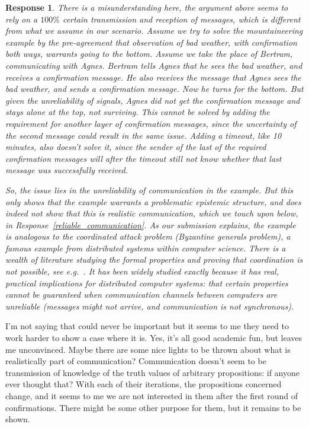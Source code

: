 \documentclass[a4paper]{article}
\newtheorem{response}{Response}
\newenvironment{tobo}{\smallskip \noindent \color{yellow!80!black!80}}{\color{black}\smallskip}
\begin{document}
\begin{response}
There is a misunderstanding here, the argument above seems to rely on a $100\% $ certain transmission and reception of messages, which is different from what we assume in our scenario. Assume we try to solve the mountaineering example by the pre-agreement that observation of bad weather, with confirmation both ways, warrants going to the bottom. Assume we take the place of Bertram, communicating with Agnes. Bertram tells Agnes that he sees the bad weather, and receives a confirmation message. He also receives the message that Agnes sees the bad weather, and sends a confirmation message. Now he turns for the bottom. But given the unreliability of signals, Agnes did not get the confirmation message and stays alone at the top, not surviving. This cannot be solved by adding the requirement for another layer of confirmation messages, since the uncertainty of the second message could result in the same issue. Adding a timeout, like 10 minutes, also doesn't solve it, since the sender of the last of the required confirmation messages will after the timeout still not know whether that last message was successfully received. 

So, the issue lies in the unreliability of communication in the example. But this only shows that the example warrants a problematic epistemic structure, and does indeed not show that this is realistic communication, which we touch upon below, in Response~\ref{reliable_communication}. As our submission explains, the example is analogous to the coordinated attack problem (Byzantine generals problem), a famous example from distributed systems within computer science. There is a wealth of literature studying the formal properties and proving that coordination is not possible, see e.g.~\cite{fagin1995reasoning}. It has been widely studied exactly because it has real, practical implications for distributed computer systems: that certain properties cannot be guaranteed when communication channels between computers are unreliable (messages might not arrive, and communication is not synchronous).
\end{response}

I'm not saying that could never be important but it seems to me they need to work harder to show a case where it is. Yes, it's all good academic fun, but leaves me unconvinced. Maybe there are some nice lights to be thrown about what is realistically part of communication? Communication doesn't seem to be transmission of knowledge of the truth values of arbitrary propositions: if anyone ever thought that? With each of their iterations, the propositions concerned change, and it seems to me we are not interested in them after the first round of confirmations. There might be some other purpose for them, but it remains to be shown.
\end{document}
